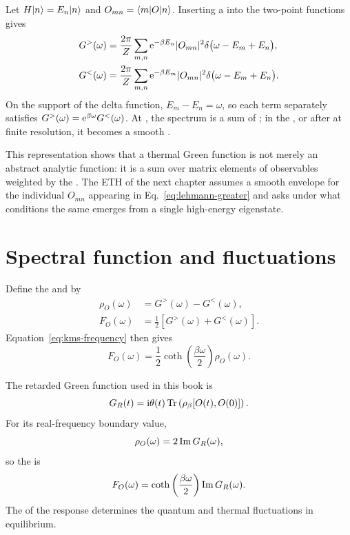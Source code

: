 Let $H\lvert n \rangle=E_n\lvert n \rangle$ and $O_{mn}=\langle m \rvert O\lvert n \rangle$. Inserting a  into the two-point functions gives
\begin{align}
G^>(\omega)
&=
\frac{2\pi}{Z}
\sum_{m,n}
\mathrm{e}^{-\beta E_n}
|O_{mn}|^2
\delta\bigl(\omega-E_m+E_n\bigr),
\label{eq:lehmann-greater}
\\
G^<(\omega)
&=
\frac{2\pi}{Z}
\sum_{m,n}
\mathrm{e}^{-\beta E_m}
|O_{mn}|^2
\delta\bigl(\omega-E_m+E_n\bigr).
\label{eq:lehmann-less}
\end{align}
On the support of the delta function, $E_m-E_n=\omega$, so each term separately satisfies $G^>(\omega)=\mathrm{e}^{\beta\omega}G^<(\omega)$. At , the spectrum is a sum of ; in the , or after  at finite resolution, it becomes a smooth .

This representation shows that a thermal Green function is not merely an abstract analytic function: it is a sum over matrix elements of observables weighted by the . The ETH of the next chapter assumes a smooth envelope for the individual $O_{mn}$ appearing in Eq.~\eqref{eq:lehmann-greater} and asks under what conditions the same  emerges from a single high-energy eigenstate.

\section{Spectral function and fluctuations}

Define the  and  by
\begin{align}
\rho_O(\omega)
&=
G^>(\omega)-G^<(\omega),
\label{eq:thermal-spectral-density}
\\
F_O(\omega)
&=
\frac{1}{2}
\left[
G^>(\omega)+G^<(\omega)
\right].
\label{eq:thermal-symmetric-density}
\end{align}
Equation~\eqref{eq:kms-frequency} then gives
\begin{equation}
F_O(\omega)
=
\frac{1}{2}
\coth\left(\frac{\beta\omega}{2}\right)
\rho_O(\omega).
\label{eq:fdt-rho}
\end{equation}

The retarded Green function used in this book is
\begin{equation}
G_R(t)
=
\mathrm{i}\theta(t)
\operatorname{Tr}\left(
\rho_\beta[O(t),O(0)]
\right).
\end{equation}
For its real-frequency boundary value,
\begin{equation}
\rho_O(\omega)
=
2\operatorname{Im} G_R(\omega),
\label{eq:spectral-im-retarded}
\end{equation}
so the  is
\begin{equation}
F_O(\omega)
=
\coth\left(\frac{\beta\omega}{2}\right)
\operatorname{Im} G_R(\omega).
\label{eq:fluctuation-dissipation}
\end{equation}
The  of the response determines the quantum and thermal fluctuations in equilibrium.

